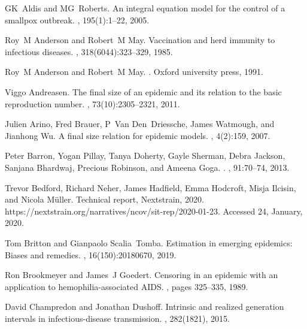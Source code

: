 \documentclass[12pt]{article}
\begin{document}
\begin{thebibliography}{10}

GK~Aldis and MG~Roberts.
\newblock An integral equation model for the control of a smallpox outbreak.
, 195(1):1--22, 2005.

Roy~M Anderson and Robert~M May.
\newblock Vaccination and herd immunity to infectious diseases.
, 318(6044):323--329, 1985.

Roy~M Anderson and Robert~M May.
.
\newblock Oxford university press, 1991.

Viggo Andreasen.
\newblock The final size of an epidemic and its relation to the basic
  reproduction number.
, 73(10):2305--2321, 2011.

Julien Arino, Fred Brauer, P~Van Den~Driessche, James Watmough, and Jianhong
  Wu.
\newblock A final size relation for epidemic models.
, 4(2):159, 2007.

Peter Barron, Yogan Pillay, Tanya Doherty, Gayle Sherman, Debra Jackson,
  Sanjana Bhardwaj, Precious Robinson, and Ameena Goga.
.
, 91:70--74, 2013.

Trevor Bedford, Richard Neher, James Hadfield, Emma Hodcroft, Misja Ilcisin,
  and Nicola M{\"u}ller.
\newblock Technical report, Nextstrain, 2020.
\newblock https://nextstrain.org/narratives/ncov/sit-rep/2020-01-23. Accessed
  24, January, 2020.

Tom Britton and Gianpaolo Scalia~Tomba.
\newblock Estimation in emerging epidemics: {Biases} and remedies.
, 16(150):20180670, 2019.

Ron Brookmeyer and James~J Goedert.
\newblock Censoring in an epidemic with an application to hemophilia-associated
  {AIDS}.
, pages 325--335, 1989.

David Champredon and Jonathan Dushoff.
\newblock Intrinsic and realized generation intervals in infectious-disease
  transmission.
, 282(1821), 2015.


\end{thebibliography}
\end{document}
